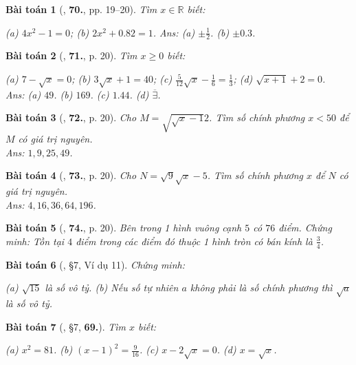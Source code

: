 \documentclass{article}
\newtheorem{baitoan}{Bài toán}
\begin{document}
\begin{baitoan}[\cite{Tuyen_Toan_7}, \textbf{70.}, pp. 19--20]
	Tìm $x\in\mathbb{R}$ biết:
	
		(a) $4x^2 - 1 = 0$;
		(b) $2x^2 + 0.82 = 1$.
	\hfill{\sf Ans:} (a) $\pm\frac{1}{2}$. (b) $\pm0.3$.
\end{baitoan}

\begin{baitoan}[\cite{Tuyen_Toan_7}, \textbf{71.}, p. 20]
	Tìm $x\ge 0$ biết:
	
		(a) $7 - \sqrt{x} = 0$;
		(b) $3\sqrt{x} + 1 = 40$;
		(c) $\frac{5}{12}\sqrt{x} - \frac{1}{6} = \frac{1}{3}$;
		(d) $\sqrt{x + 1} + 2 = 0$.
	\\\mbox{}\hfill{\sf Ans:} (a) $49$. (b) $169$. (c) $1.44$. (d) $\overline{\exists}$.
\end{baitoan}

\begin{baitoan}[\cite{Tuyen_Toan_7}, \textbf{72.}, p. 20]
	Cho $M = \sqrt{\sqrt{x} - 1}{2}$. Tìm số chính phương $x < 50$ để $M$ có giá trị nguyên.\\\mbox{}\hfill{\sf Ans:} $1,9,25,49$.
\end{baitoan}

\begin{baitoan}[\cite{Tuyen_Toan_7}, \textbf{73.}, p. 20]
	Cho $N = \sqrt{9}{\sqrt{x} - 5}$. Tìm số chính phương $x$ để $N$ có giá trị nguyên.\\\mbox{}\hfill{\sf Ans:} $4,16,36,64,196$.
\end{baitoan}

\begin{baitoan}[\cite{Tuyen_Toan_7}, \textbf{74.}, p. 20]
	Bên trong 1 hình vuông cạnh $5$ có $76$ điểm. Chứng minh: Tồn tại $4$ điểm trong các điểm đó thuộc 1 hình tròn có bán kính là $\frac{3}{4}$.
\end{baitoan}

\begin{baitoan}[\cite{Binh_Toan_7_tap_1}, \S7, Ví dụ 11]
	Chứng minh:
	
		(a) $\sqrt{15}$ là số vô tỷ.
		(b) Nếu số tự nhiên $a$ không phải là số chính phương thì $\sqrt{a}$ là số vô tỷ.
	
\end{baitoan}

\begin{baitoan}[\cite{Binh_Toan_7_tap_1}, \S7, \textbf{69.}]
	Tìm $x$ biết:
	
		(a) $x^2 = 81$.
		(b) $(x - 1)^2 = \frac{9}{16}$.
		(c) $x - 2\sqrt{x} = 0$.
		(d) $x = \sqrt{x}$.
	
\end{baitoan}
\end{document}

